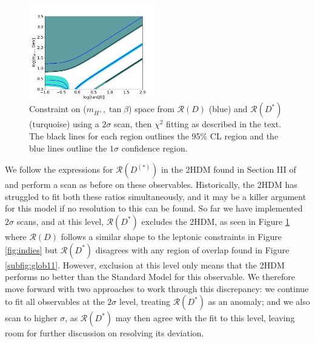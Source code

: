 \documentclass[a4paper,12pt]{article}
\begin{document}
\begin{figure}[ht]
    \centering
    \includegraphics[width=0.49\textwidth]{rd_both196sig.png}
    \caption{\label{fig:rds}Constraint on ($m_{H^+},\tan\beta$) space from $\mathcal{R}(D)$ (blue) and $\mathcal{R}(D^*)$ (turquoise) using a $2\sigma$ scan, then $\chi^2$ fitting as described in the text. 
    The black lines for each region outlines the 95\% CL region and the blue lines outline the $1\sigma$ confidence region.}
\end{figure}
We follow the expressions for $\mathcal{R}(D^{(*)})$ in the 2HDM found in Section III of \cite{rds} and perform a scan as before on these observables. 
Historically, the 2HDM has struggled to fit both these ratios simultaneously, and it may be a killer argument for this model if no resolution to this can be found. 
So far we have implemented $2\sigma$ scans, and at this level, $\mathcal{R}(D^*)$ excludes the 2HDM, as seen in Figure \ref{fig:rds} where $\mathcal{R}(D)$ follows a similar shape to the leptonic constraints in Figure \ref{fig:indies} but $\mathcal{R}(D^*)$ disagrees with any region of overlap found in Figure \ref{subfig:glob11}.
However, exclusion at this level only means that the 2HDM performs no better than the Standard Model for this observable. 
We therefore move forward with two approaches to work through this discrepancy: we continue to fit all observables at the $2\sigma$ level, treating $\mathcal{R}(D^*)$ as an anomaly; and we also scan to higher $\sigma$, as $\mathcal{R}(D^*)$ may then agree with the fit to this level, leaving room for further discussion on resolving its deviation.
\end{document}
